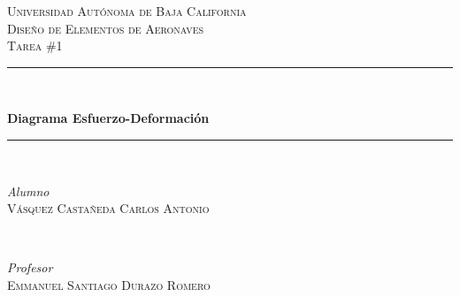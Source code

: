 \documentclass[12pt, letterpaper]{article}
\begin{document}

\begin{titlepage} %
	\vspace*{-3cm}
	\hspace*{-2.5cm}
	\newcommand{\HRule}{\rule{\linewidth}{0.5mm}} %
	\center %
	
	
	\textsc{\LARGE Universidad Autónoma de Baja California}\\[1.5cm] %
	
	\textsc{\Large Diseño de Elementos de Aeronaves}\\[0.5cm] %
	
	\textsc{\large Tarea \#1}\\[0.5cm] %
	
	
	\HRule\\[0.4cm]
	
	{\huge\bfseries Diagrama Esfuerzo-Deformación\\[0.4cm] %
	
	\HRule\\[1.5cm]
	
	
	\begin{minipage}{0.4\textwidth}
		\begin{flushleft}
			\large
			\textit{Alumno}\\
			\textsc{Vásquez Castañeda Carlos Antonio} %
		\end{flushleft}
	\end{minipage}
	~
	\begin{minipage}{0.4\textwidth}
		\begin{flushright}
			\large
			\textit{Profesor}\\
			\textsc{Emmanuel Santiago Durazo Romero} %
		\end{flushright}
	\end{minipage}
	
}
\end{titlepage}
\end{document}
